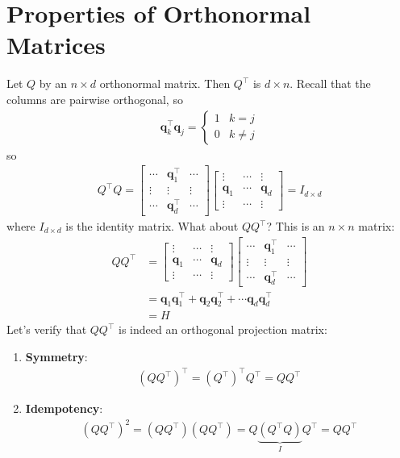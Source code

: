 \documentclass[12pt, a4paper]{article}
\theoremstyle{definition}
\begin{document}
	\section*{Properties of Orthonormal Matrices}
	Let $Q$ by an $n\times d$ orthonormal matrix. Then $Q^\top$ is $d\times n$.
	Recall that the columns are pairwise orthogonal, so
	\begin{align*}
		\mathbf{q}_k^\top\mathbf{q}_j = \begin{cases}
			1 & k = j\\
			0 & k \neq j
		\end{cases}
	\end{align*}
	so
	\begin{align*}
		Q^\top Q=\begin{bmatrix}
			\cdots & \mathbf{q}_1^\top & \cdots\\
			\vdots & \vdots& \vdots\\
			\cdots & \mathbf{q}_d^\top & \cdots
		\end{bmatrix}
		\begin{bmatrix}
			\vdots & \cdots & \vdots\\
			\mathbf{q}_1 & \cdots & \mathbf{q}_d\\
			\vdots & \cdots & \vdots
		\end{bmatrix}=
		I_{d\times d}
	\end{align*}
	where $I_{d\times d}$ is the identity matrix. What about $QQ^\top$? This
	is an $n\times n$ matrix:
	\begin{align*}
		QQ^\top&=\begin{bmatrix}
			\vdots & \cdots & \vdots\\
			\mathbf{q}_1 & \cdots & \mathbf{q}_d\\
			\vdots & \cdots & \vdots
		\end{bmatrix}
		\begin{bmatrix}
			\cdots & \mathbf{q}_1^\top & \cdots\\
			\vdots & \vdots& \vdots\\
			\cdots & \mathbf{q}_d^\top & \cdots
		\end{bmatrix}\\
		&=\mathbf{q}_1\mathbf{q}_1^\top+\mathbf{q}_2\mathbf{q}_2^\top+\cdots\mathbf{q}_d\mathbf{q}_d^\top\\
		&=H
	\end{align*}
	Let's verify that $QQ^\top$ is indeed an orthogonal projection matrix:
	\begin{enumerate}[label=(\roman*)]
		\item \textbf{Symmetry}:
		\begin{align*}
			(QQ^\top)^\top = (Q^\top)^\top Q^\top = QQ^\top
		\end{align*}
		\item \textbf{Idempotency}:
		\begin{align*}
			(Q Q^\top)^2=(Q Q^\top)(Q Q^\top)=Q\underbrace{(Q^\top Q)}_{I}Q^\top = QQ^\top
		\end{align*}
	\end{enumerate}
\end{document}
